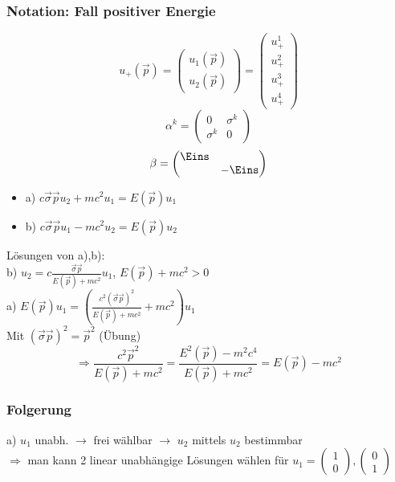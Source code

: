 \documentclass[twoside,a4paper]{scrartcl}
\renewcommand{\1}{\mathds{1}}
\newcommand{\Ra}{\Rightarrow}
\newcommand{\ra}{\rightarrow}
\begin{document}
\subsubsection*{Notation: Fall positiver Energie}
$$u_+(\vec p)=\begin{pmatrix}u_1(\vec p) \\ u_2(\vec p) \end{pmatrix}=\begin{pmatrix}u^1_+ \\ u^2_+ \\ u^3_+ \\ u^4_+ \end{pmatrix}$$
$$\alpha^k=\begin{pmatrix}0 & \sigma^k \\ \sigma^k & 0 \end{pmatrix}$$
$$\beta=\begin{pmatrix}\Eins \\  & -\Eins \end{pmatrix}$$
\begin{itemize}
\item a) $c\vec \sigma \vec p u_2+mc^2 u_1=E(\vec p)u_1$
\item b) $c\vec \sigma \vec p u_1-mc^2 u_2=E(\vec p)u_2$
\end{itemize}
Lösungen von a),b):\\
b) $u_2=c\frac{\vec \sigma \vec p}{E(\vec p)+mc^2}u_1$, $ E(\vec p)+mc^2>0$\\
a) $E(\vec p)u_1=(\frac{c^2(\vec\sigma\vec p)^2}{E(\vec p)+mc^2}+mc^2)u_1$\\
Mit $(\vec \sigma \vec p)^2=\vec p^2$ (Übung)
$$\Ra \frac{c^2\vec p^2}{E(\vec p)+mc^2}=\frac{E^2(\vec p)-m^2c^4}{E(\vec p)+mc^2}=E(\vec p)-mc^2$$
\subsubsection*{Folgerung}
a) $u_1$ unabh. $\ra$ frei wählbar $\ra$ $u_2$ mittels $u_2$ bestimmbar\\
$\Ra$ man kann 2 linear unabhängige Lösungen wählen für $u_1=\begin{pmatrix}1 \\ 0\end{pmatrix},\begin{pmatrix}0 \\ 1\end{pmatrix}$
\end{document}
